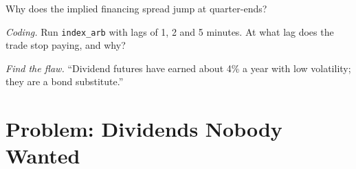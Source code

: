 \begin{exercise}[$\star\star$]\label{exo:s2:delta-one-and-dividends:6}
Why does the implied financing spread jump at quarter-ends?
\end{exercise}

\begin{exercise}[$\star\star\star$]\label{exo:s2:delta-one-and-dividends:7}
\emph{Coding.} Run \texttt{index\_arb} with lags of 1, 2 and 5 minutes. At what lag does the trade stop paying, and why?
\end{exercise}

\begin{exercise}[$\star\star\star$]\label{exo:s2:delta-one-and-dividends:8}
\emph{Find the flaw.} ``Dividend futures have earned about 4\% a year with low volatility; they are a bond substitute.''
\end{exercise}

\section{Problem: Dividends Nobody Wanted}

